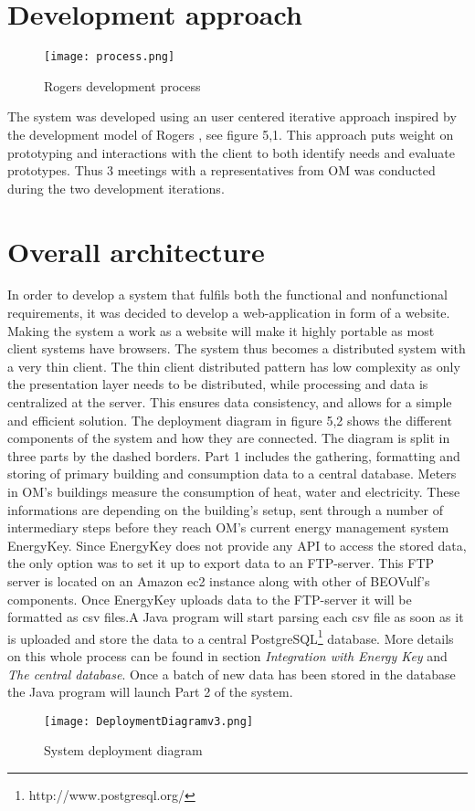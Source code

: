 \section{Development approach}
\begin{figure}
\begin{center}
\texttt{[image: process.png]}
\end{center}
\caption{Rogers development process}
\end{figure}
The system was developed using an user centered iterative approach inspired by the development model of Rogers \cite{interaction}, see figure 5,1. This approach puts weight on prototyping and interactions with the client to both identify needs and evaluate prototypes. Thus 3 meetings with a representatives from OM was conducted during the two development iterations.
\section{Overall architecture}
In order to develop a system that fulfils both the functional and nonfunctional requirements, it was decided to develop a web-application in form of a website. Making the system a work as a website will make it highly portable as most client systems have browsers. The system thus becomes a distributed system with a very thin client. The thin client distributed pattern has low complexity as only the presentation layer needs to be distributed, while processing and data is centralized at the server. This ensures data consistency, and allows for a simple and efficient solution. The deployment diagram in figure 5,2 shows the different components of the system and how they are connected. The diagram is split in three parts by the dashed borders. 
Part 1 includes the gathering, formatting and storing of primary building and consumption data to a central database. Meters in OM’s buildings measure the consumption of heat, water and electricity. These informations are depending on the building’s setup, sent through a number of intermediary steps before they reach OM’s current energy management system EnergyKey. Since EnergyKey does not provide any API to access the stored data, the only option was to set it up to export data to an FTP-server. This FTP server is located on an Amazon ec2 instance along with other of BEOVulf’s components. Once EnergyKey uploads data to the FTP-server it will be formatted as csv files.A Java program will start parsing each csv file as soon as it is uploaded and store the data to a central PostgreSQL\footnote{http://www.postgresql.org/} database. More details on this whole process can be found in section \emph{Integration with Energy Key} and \emph{The central database}. Once a batch of new data has been stored in the database the Java program will launch Part 2 of the system.
\begin{figure}
\begin{center}
\texttt{[image: DeploymentDiagramv3.png]}
\end{center}
\caption{System deployment diagram}
\end{figure}

